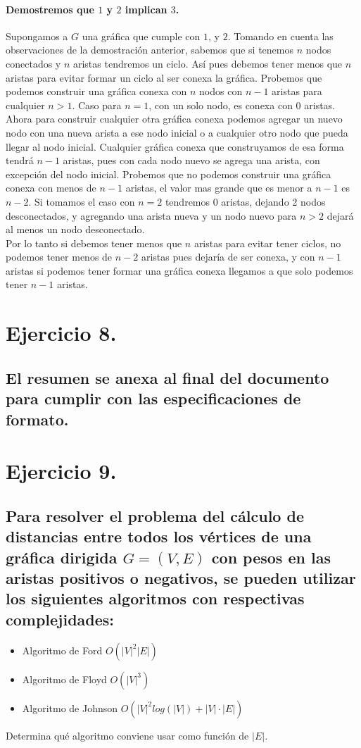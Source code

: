 \documentclass[12pt]{article}
\begin{document}
\paragraph{Demostremos que $1$ y $2$ implican $3$.}
Supongamos a $G$ una gráfica que cumple con $1$, y $2$. Tomando en cuenta las observaciones de la demostración anterior, sabemos que si tenemos $n$ nodos conectados y $n$ aristas tendremos un ciclo. Así pues debemos tener menos que $n$ aristas para evitar formar un ciclo al ser conexa la gráfica. Probemos que podemos construir una gráfica conexa con $n$ nodos con $n-1$ aristas para cualquier $n>1$. Caso para $n=1$, con un solo nodo, es conexa con $0$ aristas. Ahora para  construir cualquier otra gráfica conexa podemos agregar un nuevo nodo con una nueva arista a ese nodo inicial o a cualquier otro nodo que pueda llegar al nodo inicial. Cualquier gráfica conexa que construyamos de esa forma  tendrá $n-1$ aristas, pues con cada nodo nuevo se agrega una arista, con excepción del nodo inicial. Probemos que no podemos construir una gráfica conexa con menos de $n-1$ aristas, el valor mas grande que es menor a $n-1$ es $n-2$. Si tomamos el caso con $n=2$ tendremos 0 aristas, dejando 2 nodos desconectados, y agregando una arista nueva y un nodo nuevo para $n>2$ dejará al menos un nodo desconectado.\\
Por lo tanto si debemos tener menos que $n$ aristas para evitar tener ciclos, no podemos tener menos de $n-2$ aristas pues dejaría de ser conexa, y con $n-1$ aristas si podemos tener  formar una gráfica conexa llegamos a que solo podemos tener $n-1$ aristas.
\section{Ejercicio 8.}
\subsection{El resumen se anexa al final del documento para cumplir con las especificaciones de formato.}
\pagebreak
\section{Ejercicio 9.}
\subsection{Para resolver el problema del cálculo de distancias entre todos los vértices de una gráfica dirigida $G=(V,E)$ con pesos en las aristas positivos o negativos, se pueden utilizar los siguientes algoritmos con respectivas complejidades:}
 \begin{itemize}
\item Algoritmo de Ford $O(|V|^{2}|E|)$
\item Algoritmo de Floyd $O(|V|^{3})$
\item Algoritmo de Johnson $O(|V|^{2}log(|V|) + |V| \cdot |E|)$ 
 \end{itemize}
Determina qué algoritmo conviene usar como función de $|E|$.
\end{document}
